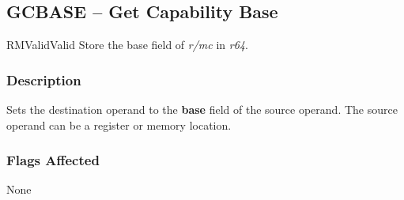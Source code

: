 \clearpage
{}
{}
\subsection*{GCBASE -- Get Capability Base}

\begin{x86opcodetable}
  {RM}{Valid}{Valid}
  {Store the base field of \emph{r/mc} in \emph{r64}.}
\end{x86opcodetable}

\begin{x86opentable}
\end{x86opentable}

\subsubsection*{Description}

Sets the destination operand to the \textbf{base} field of the source
operand.  The source operand can be a register or memory location.

\subsubsection*{Flags Affected}

None
